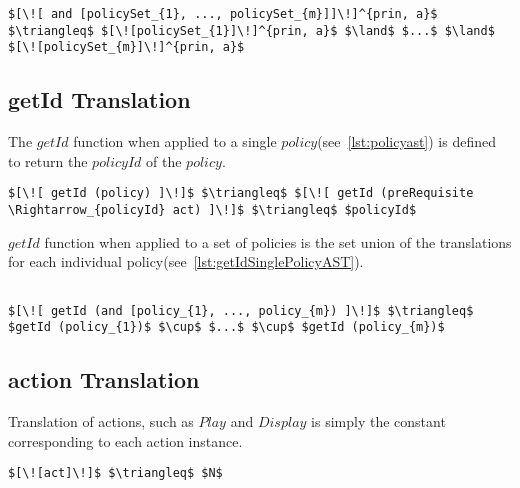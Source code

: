 \lstset{mathescape, language=AST}  
\begin{lstlisting}[frame=single, caption={Policy Set Translation Definition {$\colon$} AndPolicySet},label={lst:transpolicyformulaAndPolicySet}]
$[\![ and [policySet_{1}, ..., policySet_{m}]]\!]^{prin, a}$ $\triangleq$ $[\![policySet_{1}]\!]^{prin, a}$ $\land$ $...$ $\land$ $[\![policySet_{m}]\!]^{prin, a}$

\end{lstlisting}


\subsection{getId Translation}\label{sec:getIdtranslation}

The $getId$ function when applied to a single $policy$(see~\ref{lst:policyast}) is defined to return the $policyId$ of the $policy$.

\lstset{mathescape, language=AST}  
\begin{lstlisting}[frame=single, caption={getId for a Single policy},label={lst:getIdSinglePolicyAST}]
$[\![ getId (policy) ]\!]$ $\triangleq$ $[\![ getId (preRequisite \Rightarrow_{policyId} act) ]\!]$ $\triangleq$ $policyId$
\end{lstlisting}

$getId$ function when applied to a set of policies is the set union of the translations for each individual policy(see~\ref{lst:getIdSinglePolicyAST}).

\lstset{mathescape, language=AST}  
\begin{lstlisting}[frame=single, caption={getId for Policies Definition},label={lst:getIdAndPolicyAST}]

$[\![ getId (and [policy_{1}, ..., policy_{m}) ]\!]$ $\triangleq$ $getId (policy_{1})$ $\cup$ $...$ $\cup$ $getId (policy_{m})$
\end{lstlisting}

\subsection{action Translation}\label{sec:acttranslation}

Translation of actions, such as $Play$ and $Display$ is simply the constant corresponding to each action instance.

\lstset{mathescape, language=AST}  
\begin{lstlisting}[frame=single, caption={act Translation Definition},label={lst:actiontranslationAST}]
$[\![act]\!]$ $\triangleq$ $N$
\end{lstlisting}


